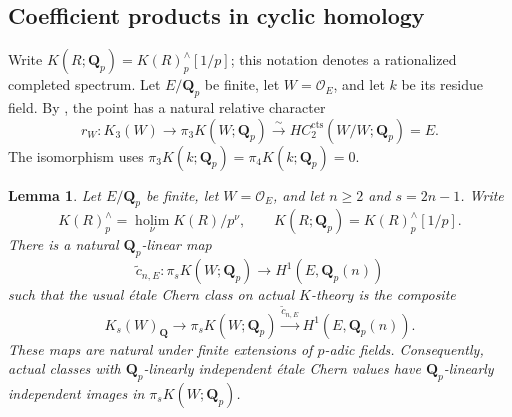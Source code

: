 \documentclass[11pt,a4paper]{amsart}
\numberwithin{equation}{section}
\newtheorem{lemma}[theorem]{Lemma}
\theoremstyle{definition}
\theoremstyle{remark}
\newcommand{\Q}{\mathbf Q}
\begin{document}
\subsection{Coefficient products in cyclic homology}
\label{d3:sec:directtccoefficients}

Write $K(R;\mathbf Q_p)=K(R)^{\wedge}_p[1/p]$; this notation denotes
a rationalized completed spectrum. Let $E/\mathbf Q_p$ be finite, let
$W=\mathcal O_E$, and let $k$ be its residue field. By
\cite[Proposition~4.10 and Example~4.3]{AMMN}, the point has a natural
relative character
\[
 r_W:K_3(W)\longrightarrow\pi_3K(W;\mathbf Q_p)
 \xrightarrow{\sim}HC_2^{\mathrm{cts}}(W/W;\mathbf Q_p)=E.
\]
The isomorphism uses
$\pi_3K(k;\mathbf Q_p)=\pi_4K(k;\mathbf Q_p)=0$.

\begin{lemma}
\label{d3:lem:cherncompletionfactor}
Let $E/\Q_p$ be finite, let $W=\mathcal O_E$, and let
$n\geq2$ and $s=2n-1$. Write
\[
 K(R)^{\wedge}_p=\operatorname*{holim}_{\nu}K(R)/p^\nu,
 \qquad K(R;\Q_p)=K(R)^{\wedge}_p[1/p].
\]
There is a natural $\Q_p$-linear map
\[
 \widetilde c_{n,E}:\pi_sK(W;\Q_p)
             \longrightarrow H^1(E,\Q_p(n))
\]
such that the usual \'etale Chern class on actual $K$-theory is
the composite
\[
 K_s(W)_{\Q}\longrightarrow\pi_sK(W;\Q_p)
       \xrightarrow{\widetilde c_{n,E}}H^1(E,\Q_p(n)).
\]
These maps are natural under finite extensions of $p$-adic fields.
Consequently, actual classes with $\Q_p$-linearly independent
\'etale Chern values have $\Q_p$-linearly independent images in
$\pi_sK(W;\Q_p)$.
\end{lemma}
\end{document}

